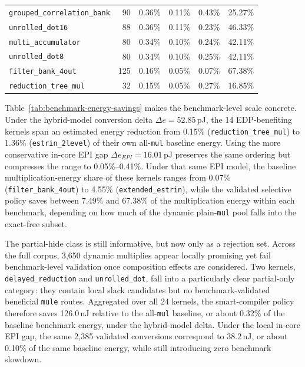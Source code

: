 \begin{table}[t]
{\begin{tabular}{l r r r r r}
\texttt{grouped\_correlation\_bank} & 90 & 0.36\% & 0.11\% & 0.43\% & 25.27\% \\
\texttt{unrolled\_dot16} & 88 & 0.36\% & 0.11\% & 0.23\% & 46.33\% \\
\texttt{multi\_accumulator} & 80 & 0.34\% & 0.10\% & 0.24\% & 42.11\% \\
\texttt{unrolled\_dot8} & 80 & 0.34\% & 0.10\% & 0.25\% & 42.11\% \\
\texttt{filter\_bank\_4out} & 125 & 0.16\% & 0.05\% & 0.07\% & 67.38\% \\
\texttt{reduction\_tree\_mul} & 32 & 0.15\% & 0.05\% & 0.27\% & 16.85\% \\
\hline
\end{tabular}
}
\end{table}

Table~\ref{tab:benchmark-energy-savings} makes the benchmark-level
scale concrete. Under the hybrid-model conversion delta
$\Delta e = 52.85$\,pJ, the 14 EDP-benefiting kernels span an estimated
energy reduction from 0.15\% (\texttt{reduction\_tree\_mul}) to 1.36\%
(\texttt{estrin\_2level}) of their own all-\texttt{mul} baseline
energy. Using the more conservative in-core EPI gap
$\Delta e_{\mathit{EPI}} = 16.01$\,pJ preserves the same ordering but
compresses the range to 0.05\%--0.41\%. Under that same EPI model, the
baseline multiplication-energy share of these kernels ranges from
0.07\% (\texttt{filter\_bank\_4out}) to 4.55\%
(\texttt{extended\_estrin}), while the validated selective policy saves
between 7.49\% and 67.38\% of the multiplication energy within each
benchmark, depending on how much of the dynamic plain-\texttt{mul} pool
falls into the exact-free subset.

The partial-hide class is still informative, but now only as a
rejection set. Across the full corpus, 3,650 dynamic multiplies appear
locally promising yet fail benchmark-level validation once composition
effects are considered. Two kernels, \texttt{delayed\_reduction} and
\texttt{unrolled\_dot}, fall into a particularly clear partial-only
category: they contain local slack candidates but no benchmark-validated
beneficial \texttt{mule} routes. Aggregated over all 24 kernels, the
smart-compiler policy therefore saves 126.0\,nJ relative to the
all-\texttt{mul} baseline, or about 0.32\% of the baseline benchmark
energy, under the hybrid-model delta. Under the local in-core EPI gap,
the same 2,385 validated conversions correspond to 38.2\,nJ, or about
0.10\% of the same baseline energy, while still introducing zero
benchmark slowdown.

